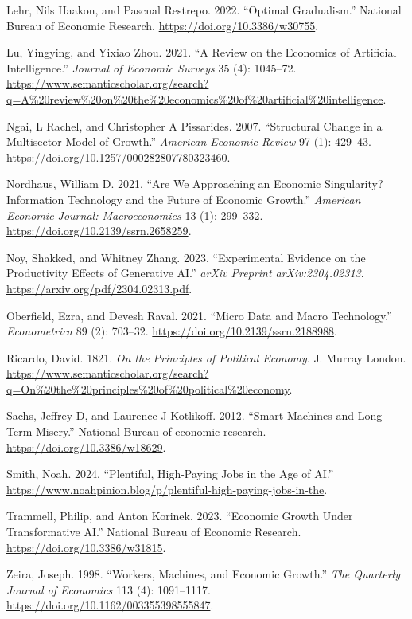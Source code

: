 \documentclass[
  11pt,
  letterpaper,
  DIV=11,
  numbers=noendperiod,
  oneside]{scrartcl}
\newlength{\cslhangindent}
\newenvironment{CSLReferences}[2] %
 {\begin{list}{}{%
  \setlength{\itemindent}{0pt}
  \setlength{\leftmargin}{0pt}
  \setlength{\parsep}{0pt}
  \ifodd #1
   \setlength{\leftmargin}{\cslhangindent}
   \setlength{\itemindent}{-1\cslhangindent}
  \fi
  \setlength{\itemsep}{#2\baselineskip}}}
 {\end{list}}
\begin{document}
\begin{CSLReferences}{1}{0}
Lehr, Nils Haakon, and Pascual Restrepo. 2022. {``Optimal Gradualism.''}
National Bureau of Economic Research.
\url{https://doi.org/10.3386/w30755}.

Lu, Yingying, and Yixiao Zhou. 2021. {``A Review on the Economics of
Artificial Intelligence.''} \emph{Journal of Economic Surveys} 35 (4):
1045--72.
\url{https://www.semanticscholar.org/search?q=A\%20review\%20on\%20the\%20economics\%20of\%20artificial\%20intelligence}.

Ngai, L Rachel, and Christopher A Pissarides. 2007. {``Structural Change
in a Multisector Model of Growth.''} \emph{American Economic Review} 97
(1): 429--43. \url{https://doi.org/10.1257/000282807780323460}.

Nordhaus, William D. 2021. {``Are We Approaching an Economic
Singularity? Information Technology and the Future of Economic
Growth.''} \emph{American Economic Journal: Macroeconomics} 13 (1):
299--332. \url{https://doi.org/10.2139/ssrn.2658259}.

Noy, Shakked, and Whitney Zhang. 2023. {``Experimental Evidence on the
Productivity Effects of Generative AI.''} \emph{arXiv Preprint
arXiv:2304.02313}. \url{https://arxiv.org/pdf/2304.02313.pdf}.

Oberfield, Ezra, and Devesh Raval. 2021. {``Micro Data and Macro
Technology.''} \emph{Econometrica} 89 (2): 703--32.
\url{https://doi.org/10.2139/ssrn.2188988}.

Ricardo, David. 1821. \emph{On the Principles of Political Economy}. J.
Murray London.
\url{https://www.semanticscholar.org/search?q=On\%20the\%20principles\%20of\%20political\%20economy}.

Sachs, Jeffrey D, and Laurence J Kotlikoff. 2012. {``Smart Machines and
Long-Term Misery.''} National Bureau of economic research.
\url{https://doi.org/10.3386/w18629}.

Smith, Noah. 2024. {``Plentiful, High-Paying Jobs in the Age of AI.''}
\url{https://www.noahpinion.blog/p/plentiful-high-paying-jobs-in-the}.

Trammell, Philip, and Anton Korinek. 2023. {``Economic Growth Under
Transformative AI.''} National Bureau of Economic Research.
\url{https://doi.org/10.3386/w31815}.

Zeira, Joseph. 1998. {``Workers, Machines, and Economic Growth.''}
\emph{The Quarterly Journal of Economics} 113 (4): 1091--1117.
\url{https://doi.org/10.1162/003355398555847}.

\end{CSLReferences}
\end{document}
